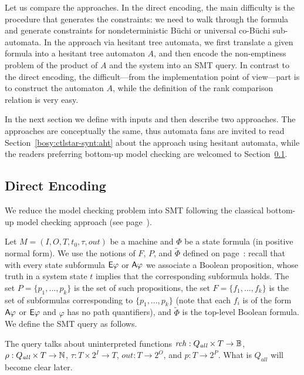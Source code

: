 Let us compare the approaches.
In the direct encoding,
the main difficulty is the procedure that generates the constraints:
we need to walk through the formula and
generate constraints for nondeterministic B\"uchi or
universal co-B\"uchi sub-automata.
In the approach via hesitant tree automata,
we first translate a given \CTLstar formula into a hesitant tree automaton $A$,
and then encode the non-emptiness problem of the product of $A$ 
and the system into an SMT query.
In contrast to the direct encoding,
the difficult---from the implementation point of view---part is to construct the automaton $A$,
while the definition of the rank comparison relation is very easy.

In the next section we define \CTLstar with inputs
and then describe two approaches.
The approaches are conceptually the same,
thus automata fans are invited to read Section~\ref{bosy:ctlstar-synt:aht}
about the approach using hesitant automata,
while the readers preferring bottom-up \CTLstar model checking are welcomed to Section~\ref{bosy:ctlstar-synt:direct}.


\subsection{Direct Encoding}\label{bosy:ctlstar-synt:direct}

We reduce the \CTLstar model checking problem into SMT
following the classical bottom-up model checking approach (see page~\pageref{page:defs:bottom-up-mc}).

Let $M=(I,O,T,t_0,\tau,out)$ be a machine
and $\Phi$ be a \CTLstar state formula (in positive normal form).
We use the notions of $F$, $P$, and $\widetilde\Phi$ defined on page~\pageref{page:defs:bottom-up-mc}:
recall that with every state subformula ${\operatorname{\mathsf{E}}}\varphi$ or ${\operatorname{\mathsf{A}}}\varphi$
we associate a Boolean proposition,
whose truth in a system state $t$ implies that the corresponding subformula holds.
The set $P=\{p_1,...,p_k\}$ is the set of such propositions,
the set $F=\{f_1,...,f_k\}$ is the set of subformulas corresponding to $\{p_1,...,p_k\}$
(note that each $f_i$ is of the form ${\operatorname{\mathsf{A}}}\varphi$ or ${\operatorname{\mathsf{E}}}\varphi$ and $\varphi$ has no path quantifiers),
and $\widetilde\Phi$ is the top-level Boolean formula.
We define the SMT query as follows.
\li

\-[(1)] The query talks about uninterpreted functions
$\mathit{rch}: Q_\textit{all} \times T \to \mathbb{B}$,
$\rho: Q_\textit{all} \times T \to \mathbb{N}$,
$\tau: T \times 2^I \to T$,
$out: T \to 2^O$, and
$p: T \to 2^P$.
What is $Q_\textit{all}$ will become clear later.

